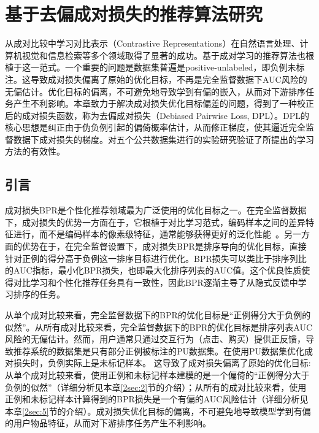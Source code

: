 \chapter{基于去偏成对损失的推荐算法研究}
\label{cha:fourthsection}
从成对比较中学习对比表示（Contrastive Representations）在自然语言处理、计算机视觉和信息检索等多个领域取得了显著的成功。基于成对学习的推荐算法也根植于这一范式。一个重要的问题是数据集普遍是positive-unlabeled，即负例未标注。这导致成对损失偏离了原始的优化目标，不再是完全监督数据下AUC风险的无偏估计。优化目标的偏离，不可避免地导致学到有偏的嵌入，从而对下游排序任务产生不利影响。本章致力于解决成对损失优化目标偏差的问题，得到了一种校正后的成对损失函数，称为去偏成对损失（Debiased Pairwise Loss, DPL）。DPL的核心思想是纠正由于伪负例引起的偏倚概率估计，从而修正梯度，使其逼近完全监督数据下成对损失的梯度。对五个公共数据集进行的实验研究验证了所提出的学习方法的有效性。

\section{引言}
成对损失BPR\cite{Steffen:2009:UAI}是个性化推荐领域最为广泛使用的优化目标之一。在完全监督数据下，成对损失的优势一方面在于，它根植于对比学习范式，编码样本之间的差异特征进行，而不是编码样本的像素级特征，通常能够获得更好的泛化性能~\cite{Wang:2020:ICML,McFadden:1974:FE,gutmann:2012:JMLR,Liu:2021:TKDE,Wang:2020:ICML}。另一方面的优势在于，在完全监督设置下，成对损失BPR\cite{Steffen:2009:UAI}是排序导向的优化目标，直接针对正例的得分高于负例这一排序目标进行优化。BPR损失可以类比于排序列比的AUC指标\cite{Steffen:2009:UAI}，最小化BPR损失，也即最大化排序列表的AUC值。这个优良性质使得对比学习和个性化推荐任务具有一致性，因此BPR逐渐主导了从隐式反馈中学习排序的任务。

从单个成对比较来看，完全监督数据下的BPR的优化目标是“正例得分大于负例的似然”。从所有成对比较来看，完全监督数据下的BPR的优化目标是排序列表AUC风险的无偏估计。然而，用户通常只通过交互行为（点击、购买）提供正反馈，导致推荐系统的数据集是只有部分正例被标注的PU数据集。在使用PU数据集优化成对损失时，负例实际上是未标记样本。
这导致了成对损失偏离了原始的优化目标:从单个成对比较来看，使用正例和未标记样本建模的是一个偏倚的“正例得分大于负例的似然”（详细分析见本章\ref{2sec:2}节的介绍）；从所有的成对比较来看，使用正例和未标记样本计算得到的BPR损失是一个有偏的AUC风险估计（详细分析见本章\ref{2sec:5}节的介绍）。成对损失优化目标的偏离，不可避免地导致模型学到有偏的用户物品特征，从而对下游排序任务产生不利影响。



